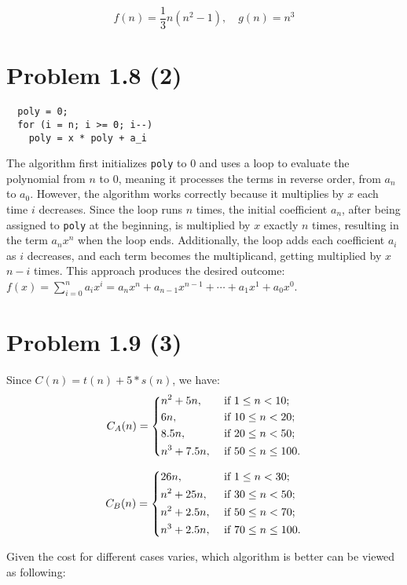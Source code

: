 \documentclass[12pt]{article}
\begin{document}
\[f(n) = \dfrac{1}{3} n(n^2 - 1), \quad g(n) = n^3\]

\section*{Problem 1.8 (2)}

\begin{verbatim}
  poly = 0;
  for (i = n; i >= 0; i--)
    poly = x * poly + a_i
\end{verbatim}

The algorithm first initializes \verb|poly| to 0 and uses a loop to evaluate the polynomial from \(n\) to 0, meaning it processes the terms in reverse order, from \(a_n\) to \(a_0\). However, the algorithm works correctly because it multiplies by \(x\) each time \(i\) decreases. Since the loop runs \(n\) times, the initial coefficient \(a_n\), after being assigned to \verb|poly| at the beginning, is multiplied by \(x\) exactly \(n\) times, resulting in the term \(a_n x^n\) when the loop ends. Additionally, the loop adds each coefficient \(a_i\) as \(i\) decreases, and each term becomes the multiplicand, getting multiplied by \(x\) \(n - i\) times. This approach produces the desired outcome: \(f(x) = \sum_{i = 0}^n a_i x^i = a_n x^n + a_{n-1} x^{n-1} + \cdots + a_1 x^1 + a_0 x^0\).

\section*{Problem 1.9 (3)}

Since \(C(n) = t(n) + 5 * s(n)\), we have:
\[
  C_A (n) = \begin{dcases}
    n^2 + 5n , &\text{ if } 1 \leq n < 10 ;\\
    6n , &\text{ if } 10 \leq n < 20 ;\\
    8.5n , &\text{ if } 20 \leq n < 50 ;\\
    n^3 + 7.5n , &\text{ if } 50 \leq n \leq 100 .
  \end{dcases}
\]

\[
  C_B (n) = \begin{dcases}
    26n , &\text{ if } 1 \leq n < 30 ;\\
    n^2 + 25n , &\text{ if } 30 \leq n < 50 ;\\
    n^2 + 2.5n , &\text{ if } 50 \leq n < 70 ;\\
    n^3 + 2.5n , &\text{ if } 70 \leq n \leq 100 .
  \end{dcases}
\]

Given the cost for different cases varies, which algorithm is better can be viewed as following: 
\end{document}
